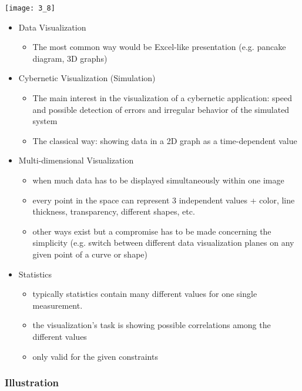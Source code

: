 \documentclass{standalone}
\begin{document}
\texttt{[image: 3\_8]}

\begin{itemize}
	\item Data Visualization
		\begin{itemize}
			\item The most common way would be Excel-like presentation (e.g. pancake diagram, 3D graphs)
		\end{itemize}
	\item Cybernetic Visualization (Simulation)
		\begin{itemize}
			\item The main interest in the visualization of a cybernetic application: speed and possible detection of errors and irregular behavior of the simulated system
			\item The classical way: showing data in a 2D graph as a time-dependent value
		\end{itemize}
	\item Multi-dimensional Visualization
		\begin{itemize}
			\item when much data has to be displayed simultaneously within one image
			\item every point in the space can represent 3 independent values + color, line thickness, transparency, different shapes, etc.
			\item other ways exist but a compromise has to be made concerning the simplicity (e.g. switch between different data visualization planes on any given point of a curve or shape)
		\end{itemize}
	\item Statistics
		\begin{itemize}
			\item typically statistics contain many different values for one single measurement.
			\item the visualization's task is showing possible correlations among the different values
			\item only valid for the given constraints
		\end{itemize}
\end{itemize}

\subsubsection*{Illustration}
\end{document}

